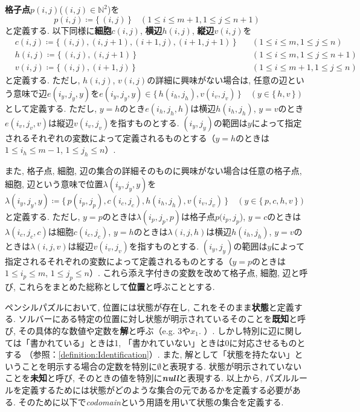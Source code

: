 \begin{definition}[格子点$p(i,j)$, 細胞$c(i,j)$, 横辺$h(i,j)$, 縦辺$v(i,j)$, 位置]\label{definition:VariableAtBoard}
  \textbf{格子点}$p(i,j)$($(i,j)\in \mathbb{N}^2$)を
  \begin{equation}
    p(i,j)\coloneqq \{\,(i,j)\,\} \quad (1\le i \le m+1, 1\le j \le n+1)
  \end{equation}
  と定義する. 以下同様に\textbf{細胞}$c(i,j)$, \textbf{横辺}$h(i,j)$, \textbf{縦辺}$v(i,j)$を
  \begin{align}
     & c(i,j)\coloneqq  \{\,(i,j), (i,j+1), (i+1,j), (i+1,j+1)\,\}  \quad & (1\le i \le m, 1\le j \le n)   \\
     & h(i,j)\coloneqq  \{\,(i,j), (i,j+1)\,\}                      \quad & (1\le i \le m, 1\le j \le n+1) \\
     & v(i,j)\coloneqq  \{\,(i,j), (i+1,j)\,\}                      \quad & (1\le i \le m+1, 1\le j \le n)
  \end{align}
  と定義する. ただし, $h(i,j)$, $v(i,j)$の詳細に興味がない場合は, 任意の辺という意味で辺$e(i_y,j_y,y)$を$e(i_y,j_y,y) \in \{\,h(i_h,j_h), v(i_v,j_v)\,\} \quad (y \in \{\,h,v\,\})$として定義する.   ただし, $y=h$のとき$e(i_h,j_h,h)$は横辺$h(i_h,j_h)$, $y=v$のとき$e(i_v,j_v,v)$は縦辺$v(i_v,j_v)$を指すものとする. $(i_y,j_y)$の範囲は$y$によって指定されるそれぞれの変数によって定義されるものとする（$y=h$のときは$1\le i_h \le m-1$, $1\le j_h \le n$）.

  また, 格子点, 細胞, 辺の集合の詳細そのものに興味がない場合は任意の格子点, 細胞, 辺という意味で位置$\lambda(i_y,j_y,y)$を$\lambda(i_y,j_y,y) \coloneqq \{\,p(i_p,j_p),c(i_c,j_c),h(i_h,j_h),v(i_v,j_v)\,\} \quad (y \in \{\,p,c,h,v\,\})$と定義する. ただし, $y=p$のときは$\lambda(i_p,j_p,p)$は格子点$p(i_p,j_p$), $y=c$のときは$\lambda(i_c,j_c,c)$は細胞$c(i_c,j_c)$, $y=h$のときは$\lambda(i,j,h)$は横辺$h(i_h,j_h)$, $y=v$のときは$\lambda(i,j,v)$は縦辺$v(i_v,j_v)$を指すものとする. $(i_y,j_y)$の範囲は$y$によって指定されるそれぞれの変数によって定義されるものとする（$y=p$のときは$1\le i_p \le m$, $1\le j_p \le n$）.
  これら添え字付きの変数を改めて格子点, 細胞, 辺と呼び, これらをまとめた総称として\textbf{位置}と呼ぶこととする.
\end{definition}
ペンシルパズルにおいて, 位置には状態が存在し, これをそのまま\textbf{状態}と定義する. ソルバーにある特定の位置に対し状態が明示されているそのことを\textbf{既知}と呼び, その具体的な数値や定数を\textbf{解}と呼ぶ（e.g. 3や$x_1$. ）. しかし特別に辺に関しては「書かれている」ときは1, 「書かれていない」ときは0に対応させるものとする （参照：\cref{definition:Identification}）. また, 解として「状態を持たない」ということを明示する場合の定数を特別に$\emptyset$と表現する. 状態が明示されていないことを\textbf{未知}と呼び, そのときの値を特別に\textbf{\textit{null}}と表現する.
以上から, パズルルールを定義するためには状態がどのような集合の元であるかを定義する必要がある. そのために以下で\textit{codomain}という用語を用いて状態の集合を定義する.

